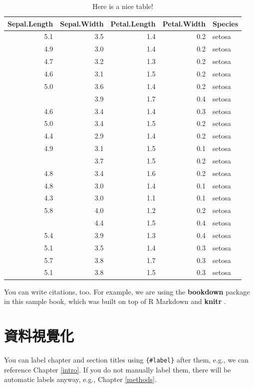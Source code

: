 \documentclass[]{book}
\theoremstyle{definition}
\theoremstyle{definition}
\theoremstyle{remark}
\begin{document}
\begin{table}

\caption{\label{tab:nice-tab6}Here is a nice table!}
\centering
\begin{tabular}[t]{rrrrl}
\toprule
Sepal.Length & Sepal.Width & Petal.Length & Petal.Width & Species\\
\midrule
5.1 & 3.5 & 1.4 & 0.2 & setosa\\
4.9 & 3.0 & 1.4 & 0.2 & setosa\\
4.7 & 3.2 & 1.3 & 0.2 & setosa\\
4.6 & 3.1 & 1.5 & 0.2 & setosa\\
5.0 & 3.6 & 1.4 & 0.2 & setosa\\
\addlinespace
5.4 & 3.9 & 1.7 & 0.4 & setosa\\
4.6 & 3.4 & 1.4 & 0.3 & setosa\\
5.0 & 3.4 & 1.5 & 0.2 & setosa\\
4.4 & 2.9 & 1.4 & 0.2 & setosa\\
4.9 & 3.1 & 1.5 & 0.1 & setosa\\
\addlinespace
5.4 & 3.7 & 1.5 & 0.2 & setosa\\
4.8 & 3.4 & 1.6 & 0.2 & setosa\\
4.8 & 3.0 & 1.4 & 0.1 & setosa\\
4.3 & 3.0 & 1.1 & 0.1 & setosa\\
5.8 & 4.0 & 1.2 & 0.2 & setosa\\
\addlinespace
5.7 & 4.4 & 1.5 & 0.4 & setosa\\
5.4 & 3.9 & 1.3 & 0.4 & setosa\\
5.1 & 3.5 & 1.4 & 0.3 & setosa\\
5.7 & 3.8 & 1.7 & 0.3 & setosa\\
5.1 & 3.8 & 1.5 & 0.3 & setosa\\
\bottomrule
\end{tabular}
\end{table}

You can write citations, too. For example, we are using the
\textbf{bookdown} package \citep{R-bookdown} in this sample book, which
was built on top of R Markdown and \textbf{knitr} \citep{xie2015}.

\chapter{資料視覺化}\label{vis}

You can label chapter and section titles using \texttt{\{\#label\}}
after them, e.g., we can reference Chapter \ref{intro}. If you do not
manually label them, there will be automatic labels anyway, e.g.,
Chapter \ref{methods}.
\end{document}
